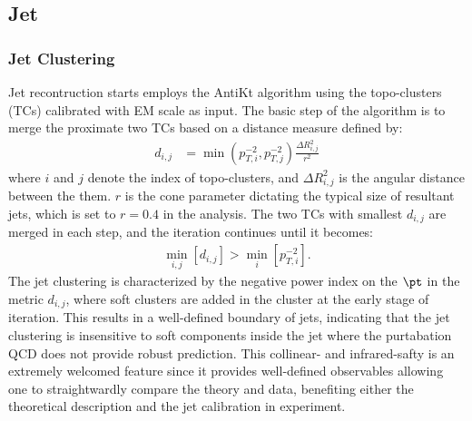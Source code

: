 


\subsection{Jet} \label{sec::objDef::jets}

\subsubsection{Jet Clustering} \label{sec::objDef::jets::clustering}
Jet recontruction starts employs the AntiKt algorithm \cite{141_antiKt} using the topo-clusters (TCs) calibrated with EM scale as input.
The basic step of the algorithm is to merge the proximate two TCs based on a distance measure defined by:
\begin{align}
d_{i,j} & = \min(p_{T,i}^{-2},p_{T,j}^{-2}) \frac{\Delta R^2_{i,j}}{r^2} 
\end{align}
where $i$ and $j$ denote the index of topo-clusters, and $\Delta R^2_{i,j}$ is the angular distance between the them.
$r$ is the cone parameter dictating the typical size of resultant jets, which is set to $r=0.4$ in the analysis.
The two TCs with smallest $d_{i,j}$ are merged in each step, and the iteration continues until it becomes:
\begin{align}
\min_{i,j} \left[ d_{i,j} \right] > \min_{i} \left[ p_{T,i}^{-2} \right].
\end{align}
The \antikt jet clustering is characterized by the negative power index on the $\pt$ in the metric $d_{i,j}$, 
where soft clusters are added in the cluster at the early stage of iteration.
This results in a well-defined boundary of jets, indicating that the jet clustering is insensitive to soft components inside the jet where the purtabation QCD does not provide robust prediction. This collinear- and infrared-safty is an extremely welcomed feature since it provides well-defined observables allowing one to straightwardly compare the theory and data, benefiting either the theoretical description and the jet calibration in experiment.


